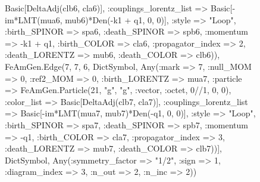 \documentclass{revtex4}
\begin{document}
\begin{figure}[!htb]
\begin{center}
{Basic[DeltaAdj(clb6, cla6)], :couplings_lorentz_list => Basic[-im*LMT(mua6, mub6)*Den(-k1 + q1, 0, 0)], :style => "Loop", :birth_SPINOR => spa6, :death_SPINOR => spb6, :momentum => -k1 + q1, :birth_COLOR => cla6, :propagator_index => 2, :death_LORENTZ => mub6, :death_COLOR => clb6)), FeAmGen.Edge(7, 7, 6, Dict{Symbol, Any}(:mark => 7, :null_MOM => 0, :ref2_MOM => 0, :birth_LORENTZ => mua7, :particle => FeAmGen.Particle(21, "g", "g", :vector, :octet, 0//1, 0, 0), :color_list => Basic[DeltaAdj(clb7, cla7)], :couplings_lorentz_list => Basic[-im*LMT(mua7, mub7)*Den(-q1, 0, 0)], :style => "Loop", :birth_SPINOR => spa7, :death_SPINOR => spb7, :momentum => -q1, :birth_COLOR => cla7, :propagator_index => 3, :death_LORENTZ => mub7, :death_COLOR => clb7))], Dict{Symbol, Any}(:symmetry_factor => "1/2", :sign => 1, :diagram_index => 3, :n_out => 2, :n_inc => 2)) 
}
\end{center}
\end{figure}
\end{document}
